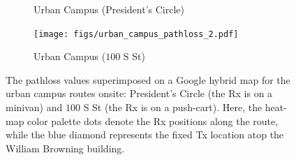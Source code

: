 \documentclass[10pt, twocolumn]{IEEEtran}
\begin{document}
{\begin{figure} [t]
\begin{subfigure}{0.564\linewidth}
        \caption{Urban Campus (President's Circle)}
        \label{F5a}
    \end{subfigure}
    \begin{subfigure}{0.426\linewidth}
        \centering
        \texttt{[image: figs/urban\_campus\_pathloss\_2.pdf]}
        \caption{Urban Campus ($100$ S St)}
        \label{F5b}
    \end{subfigure}
    \vspace{-8mm}
    \caption{The pathloss values superimposed on a Google hybrid map for the urban campus routes onsite: President's Circle (the Rx is on a minivan) and $100$ S St (the Rx is on a push-cart). Here, the heat-map color palette dots denote the Rx positions along the route, while the blue diamond represents the fixed Tx location atop the William Browning building.}
    \label{F5}
\end{figure}

}
\end{document}
